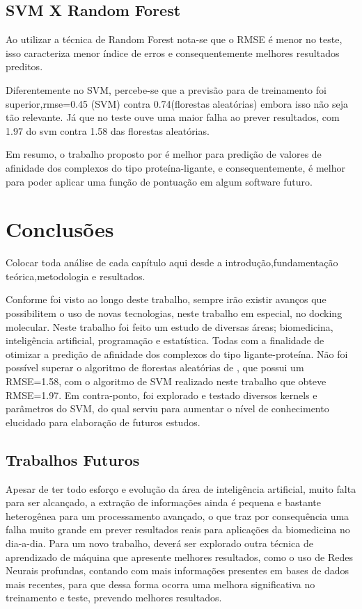 \documentclass[tcc, capa]{texucpel}
\begin{document}
\section{SVM X Random Forest}
Ao utilizar a técnica de Random Forest nota-se que o RMSE é menor no teste, isso caracteriza menor índice de erros e consequentemente melhores resultados preditos.

Diferentemente no SVM, percebe-se que a previsão para de treinamento foi superior,rmse=0.45 (SVM) contra 0.74(florestas aleatórias) embora isso não seja tão relevante.
Já que no teste ouve uma maior falha ao prever resultados, com 1.97 do svm contra 1.58 das florestas aleatórias.

Em resumo, o trabalho proposto por \citeauthor{ballester2010machine} é melhor para predição de valores de afinidade dos complexos do tipo proteína-ligante, e consequentemente, é melhor para poder aplicar uma função de pontuação em algum software futuro.

\chapter{Conclusões}

Colocar toda análise de cada capítulo aqui desde a introdução,fundamentação teórica,metodologia e resultados.

Conforme foi visto ao longo deste trabalho, sempre irão existir avanços que possibilitem o uso de novas tecnologias, neste trabalho em especial, no docking molecular.
Neste trabalho foi feito um estudo de diversas áreas; biomedicina, inteligência artificial, programação e estatística. Todas com a finalidade de otimizar a predição de afinidade dos complexos do tipo ligante-proteína.
Não foi possível superar o algoritmo de florestas aleatórias de \citeauthor{ballester2010machine}, que possui um RMSE=1.58, com o algoritmo de SVM realizado neste trabalho que obteve RMSE=1.97.
Em contra-ponto, foi explorado e testado diversos kernels e parâmetros do SVM, do qual serviu para aumentar o nível de conhecimento elucidado para elaboração de futuros estudos. 


\section{Trabalhos Futuros}

Apesar de ter todo esforço e evolução da área de inteligência artificial, muito falta para ser alcançado, a extração de informações ainda é pequena e bastante heterogênea para um processamento avançado, o que traz por consequência uma falha muito grande em prever resultados reais para aplicações da biomedicina no dia-a-dia.
Para um novo trabalho, deverá ser explorado outra técnica de aprendizado de máquina que apresente melhores resultados, como o uso de Redes Neurais profundas, contando com mais informações presentes em bases de dados mais recentes, para que dessa forma ocorra uma melhora significativa no treinamento e teste, prevendo melhores resultados.




\end{document}
